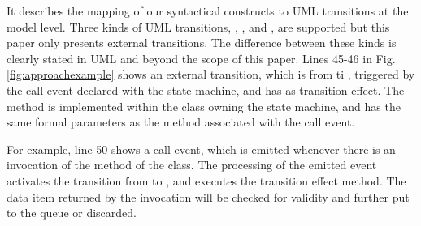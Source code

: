 

\noindent
{}
It describes the mapping of our syntactical constructs to UML transitions at the model level. 
Three kinds of UML transitions, , , and , are supported but this paper only presents external transitions.
The difference between these kinds is clearly stated in UML and beyond the scope of this paper.
Lines 45-46 in Fig. \ref{fig:approachexample} shows an external transition, which is from  ti , triggered by the  call event declared with the state machine, and has  as transition effect.
The  method is implemented within the  class owning the state machine, and has the same formal parameters as the  method associated with the call event.

For example, line 50 shows a call event, which is emitted whenever there is an invocation of the  method of the  class. 
The processing of the emitted event activates the transition from  to , and executes the  transition effect method.
The data item returned by the invocation will be checked for validity and further put to the queue or discarded.

